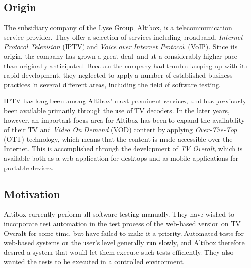 








\subsection{Origin} %
The subsidiary company of the Lyse Group, Altibox, is a telecommunication service provider. They offer a selection of services including broadband, \emph{Internet Protocol Television} (IPTV) and \emph{Voice over Internet Protocol}, (VoIP). Since its origin, the company has grown a great deal, and at a considerably higher pace than originally anticipated. Because the company had trouble keeping up with its rapid development, they neglected to apply a number of established business practices in several different areas, including the field of software testing. 

IPTV has long been among Altibox' most prominent services, and has previously been available primarily through the use of TV decoders. In the later years, however, an important focus area for Altibox has been to expand the availability of their TV and \emph{Video On Demand} (VOD) content by applying \emph{Over-The-Top} (OTT) technology, which means that the content is made accessible over the Internet. This is accomplished through the development of \emph{TV Overalt}, which is available both as a web application for desktops and as mobile applications for portable devices. %

\subsection{Motivation} %
Altibox currently perform all software testing manually. They have wished to incorporate test automation in the test process of the web-based version on TV Overalt for some time, but have failed to make it a priority. Automated tests for web-based systems on the user's level generally run slowly, and Altibox therefore desired a system that would let them execute such tests efficiently. They also wanted the tests to be executed in a controlled environment.

